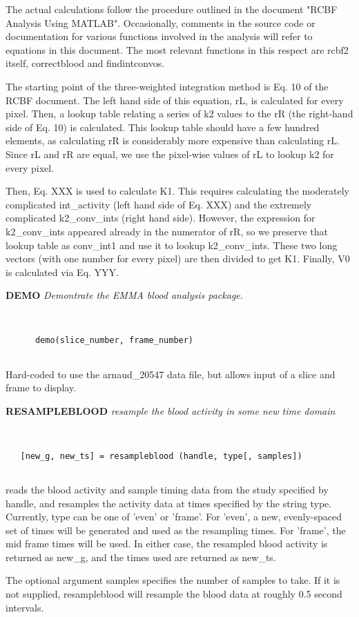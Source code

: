   The actual calculations follow the procedure outlined in the
  document "RCBF Analysis Using MATLAB".  Occasionally, comments in
  the source code or documentation for various functions involved in
  the analysis will refer to equations in this document.  The most
  relevant functions in this respect are rcbf2 itself, correctblood
  and findintconvos.
  
  The starting point of the three-weighted integration method is Eq.
  10 of the RCBF document.  The left hand side of this equation, rL,
  is calculated for every pixel.  Then, a lookup table relating a
  series of k2 values to the rR (the right-hand side of Eq. 10) is
  calculated.  This lookup table should have a few hundred elements,
  as calculating rR is considerably more expensive than calculating
  rL.  Since rL and rR are equal, we use the pixel-wise values of rL
  to lookup k2 for every pixel.
  
  Then, Eq. XXX is used to calculate K1.  This requires calculating
  the moderately complicated int\_activity (left hand side of Eq. XXX)
  and the extremely complicated k2\_conv\_ints (right hand side).
  However, the expression for k2\_conv\_ints appeared already in the
  numerator of rR, so we preserve that lookup table as conv\_int1 and
  use it to lookup k2\_conv\_ints.  These two long vectors (with one
  number for every pixel) are then divided to get K1.  Finally, V0 is
  calculated via Eq. YYY.
\newpage


{\large\bf DEMO} {\em  Demontrate the EMMA blood analysis package.}
\begin{verbatim}


      demo(slice_number, frame_number)


\end{verbatim}

  Hard-coded to use the arnaud\_20547 data
  file, but allows input of a slice and
  frame to display.
\newpage


{\large\bf RESAMPLEBLOOD} {\em  resample the blood activity in some new time domain}
\begin{verbatim}


   [new_g, new_ts] = resampleblood (handle, type[, samples])


\end{verbatim}

   reads the blood activity and sample timing data from the study
   specified by handle, and resamples the activity data at times
   specified by the string type.  Currently, type can be one of 'even'
   or 'frame'.  For 'even', a new, evenly-spaced set of times will be
   generated and used as the resampling times.  For 'frame', the mid
   frame times will be used.  In either case, the resampled blood
   activity is returned as new\_g, and the times used are returned as
   new\_ts.
 
   The optional argument samples specifies the number of samples
   to take.  If it is not supplied, resampleblood will resample the
   blood data at roughly 0.5 second intervals.
\newpage













